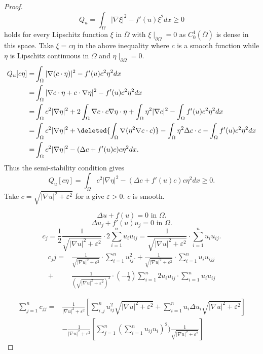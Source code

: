 \documentclass[paper=a4, fontsize=11pt]{scrartcl} %
\numberwithin{equation}{section} %
\numberwithin{figure}{section} %
\numberwithin{table}{section} %
\numberwithin{exercise}{section}
\begin{document}
\begin{itemize}
\begin{proof}
$$ Q_{u}=\int_{\Omega} |\nabla \xi|
^2 -f'(u)\xi^2 dx\geq 0 $$
holds for every Lipschitz function $\xi$ in $\bar{\Omega}$ with $\xi\mid_{\partial \Omega}=0$ as $C_{0}^1(\bar{\Omega})$ is dense in this space. Take $\xi=c\eta$ in the above inequality where $c$ is a smooth function while $\eta$ is Lipschitz continuous in $\bar{\Omega}$ and $\eta\mid_{\partial \Omega}=0.$
\begin{align*}
Q_{u}[c\eta]=&\int_{\Omega} |\nabla (c\cdot\eta) |^2-f'(u) c^2 \eta^2 dx\\
{}=&\int_{\Omega} |\nabla c\cdot\eta +c\cdot \nabla \eta|^2-f'(u) c^2 \eta^2 dx\\
{}=&\int_{\Omega} c^2|\nabla \eta|^2 +2 \int_{\Omega} \nabla c\cdot c \nabla \eta \cdot \eta +\int_{\Omega}\eta^2 |\nabla c|^2- \int_{\Omega} f'(u) c^2\eta^2 dx\\
{}=&\int_{\Omega}  c^2  | \nabla \eta|^2 +\deleted{ \int_{\Omega}\nabla(\eta^2\nabla c\cdot c) }-\int_{\Omega} \eta^2 \Delta c\cdot c-\int_{\Omega} f'(u) c^2 \eta^2 dx\\
{}=&\int_{\Omega} c^2 |\nabla \eta|^2-(\Delta c+f'(u) c)c \eta^2 dx.\\
\end{align*}
Thus the semi-stability condition gives
\begin{equation}\label{semistability}
Q_{u}[c\eta]=\int_{\Omega} c^2 |\nabla \eta|^2-(\Delta c+f'(u) c)c \eta^2 dx\geq 0.
\end{equation}
Take $c=\sqrt{|\nabla u|^2 +\varepsilon^2}$ for a give $\varepsilon>0.$ $c$ is smooth.

$$\Delta u+f(u)=0 \mbox{ in } \Omega.$$
$$\Delta u_j+f'(u)u_j=0 \mbox{ in } \Omega.$$
$$c_j=\frac{1}{2}\frac{1}{\sqrt{|\nabla u|^2 +\varepsilon^2}} \cdot 2 \sum_{i=1}^n u_i u_{ij}=\frac{1}{\sqrt{|\nabla u|^2 +\varepsilon^2}} \cdot\sum_{i=1}^n u_i u_{ij}.$$
\begin{align*}
c_{j}j=&\frac{1}{\sqrt{|\nabla u|^2 +\varepsilon^2}} \cdot\sum_{i=1}^n  u_{ij}^2.+\frac{1}{\sqrt{|\nabla u|^2 +\varepsilon^2}} \cdot\sum_{i=1}^n u_i u_{ijj}\\
{}+&\frac{1}{(\sqrt{|\nabla u|^2 +\varepsilon^2})^3} \cdot(-\frac{1}{2})\sum_{i=1}^n 2u_i u_{ij} \cdot \sum_{i=1}^n u_i u_{ij}
\end{align*}

\begin{align*}
\sum_{j=1}^n c_{jj}=& \frac{1}{|\nabla u|^2 +\varepsilon^2}\left[ \sum_{i,j}^n u_{ij}^2 \sqrt{|\nabla u|^2 +\varepsilon^2} +\sum_{i=1}^n u_i \Delta u_i \sqrt{|\nabla u|^2 +\varepsilon^2}\right] \\
{}& -\frac{1}{|\nabla u|^2 +\varepsilon^2}\left[ \sum_{j=1}^n (\sum_{i=1}^n u_{ij} u_i)^2 )\frac{1}{\sqrt{|\nabla u|^2 +\varepsilon^2}} \right]
\end{align*}


\end{proof}
\end{itemize}
\end{document}
